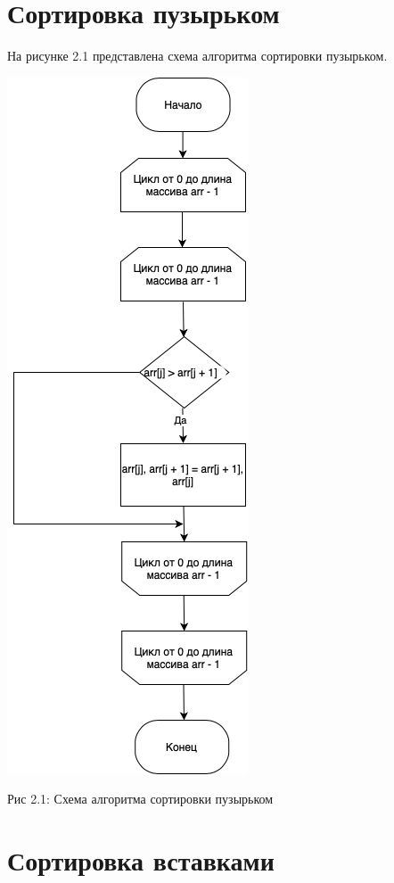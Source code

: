 \documentclass[12pt]{report}
\begin{document}
\section{Сортировка пузырьком}
На рисунке 2.1 представлена схема алгоритма сортировки пузырьком.
\begin{center}
		\includegraphics[scale=0.8]{BubbleSort.png}
		
			Рис 2.1: Схема алгоритма сортировки пузырьком
\end{center}

\section{Сортировка вставками}
\end{document}
